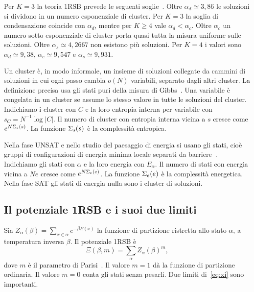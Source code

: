 Per $K=3$ la teoria 1RSB prevede le seguenti soglie~\citep{krzakala2007clusters,mertens2006threshold}.
Oltre $\alpha_d\simeq3{,}86$ le soluzioni si dividono in un numero esponenziale di cluster.
Per $K=3$ la soglia di condensazione coincide con $\alpha_d$, mentre per $K\ge4$ vale $\alpha_d<\alpha_c$.
Oltre $\alpha_c$ un numero sotto-esponenziale di cluster porta quasi tutta la misura uniforme sulle soluzioni.
Oltre $\alpha_s\simeq4{,}2667$ non esistono più soluzioni.
Per $K=4$ i valori sono $\alpha_d\simeq9{,}38$, $\alpha_c\simeq9{,}547$ e $\alpha_s\simeq9{,}931$.

Un cluster è, in modo informale, un insieme di soluzioni collegate da cammini di soluzioni in cui ogni passo cambia $o(N)$ variabili, separato dagli altri cluster.
La definizione precisa usa gli stati puri della misura di Gibbs~\citep{krzakala2007clusters,mezard2009information}.
Una variabile è congelata in un cluster se assume lo stesso valore in tutte le soluzioni del cluster.
Indichiamo i cluster con $C$ e la loro entropia interna per variabile con $s_C=N^{-1}\log|C|$.
Il numero di cluster con entropia interna vicina a $s$ cresce come $e^{N\Sigma_s(s)}$.
La funzione $\Sigma_s(s)$ è la complessità entropica.

Nella fase UNSAT e nello studio del paesaggio di energia si usano gli stati, cioè gruppi di configurazioni di energia minima locale separati da barriere~\citep{mezard2002random,mezard2003cavity}.
Indichiamo gli stati con $\alpha$ e la loro energia con $E_\alpha$.
Il numero di stati con energia vicina a $Ne$ cresce come $e^{N\Sigma_e(e)}$.
La funzione $\Sigma_e(e)$ è la complessità energetica.
Nella fase SAT gli stati di energia nulla sono i cluster di soluzioni.

\subsection{Il potenziale 1RSB e i suoi due limiti}

Sia $Z_\alpha(\beta)=\sum_{x\in\alpha}e^{-\beta E(x)}$ la funzione di partizione ristretta allo stato $\alpha$, a temperatura inversa $\beta$.
Il potenziale 1RSB è
\begin{equation}
\Xi(\beta,m)=\sum_\alpha Z_\alpha(\beta)^{m},
\label{eq:xi}
\end{equation}
dove $m$ è il parametro di Parisi~\citep{parisi1980sequence,mezard2001bethe,monasson1995structural}.
Il valore $m=1$ dà la funzione di partizione ordinaria.
Il valore $m=0$ conta gli stati senza pesarli.
Due limiti di~\eqref{eq:xi} sono importanti.

